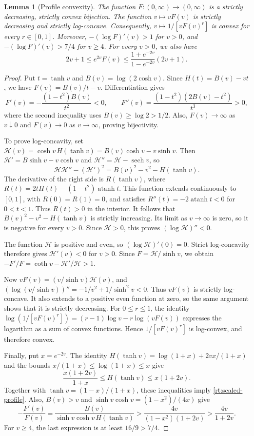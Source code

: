 \documentclass[11pt,letterpaper]{amsart}
\newcommand{\1}{\mathbf 1}
\DeclareMathOperator{\atanh}{atanh}
\newtheorem{lemma}[theorem]{Lemma}
\numberwithin{equation}{section}
\begin{document}
\begin{lemma}[Profile convexity]\label{as:profile-convex}
The function $F:(0,\infty)\to(0,\infty)$ is a strictly
decreasing, strictly convex bijection.
The function $v\mapsto vF(v)$ is strictly decreasing and
strictly log-concave. Consequently,
$v\mapsto1/[vF(v)^r]$ is convex for every $r\in[0,1]$.
Moreover, $-(\log F)'(v)>1$ for $v>0$, and
$-(\log F)'(v)>7/4$ for $v\ge4$.
For every $v>0$, we also have
\begin{equation}\label{rt:scaled-profile}
 2v+1\le e^{2v}F(v)
 \le\frac{1+e^{-2v}}{1-e^{-2v}}(2v+1).
\end{equation}
\end{lemma}
\begin{proof}
Put $t=\tanh v$ and $B(v)=\log(2\cosh v)$.
Since $H(t)=B(v)-vt$, we have $F(v)=B(v)/t-v$.
Differentiation gives
\[
 F'(v)=-\frac{(1-t^2)B(v)}{t^2}<0,\qquad
 F''(v)=\frac{(1-t^2)(2B(v)-t^2)}{t^3}>0,
\]
where the second inequality uses $B(v)\ge\log2>1/2$.
Also, $F(v)\to\infty$ as $v\downarrow0$ and
$F(v)\to0$ as $v\to\infty$, proving bijectivity.

To prove log-concavity, set
$\mathcal H(v)=\cosh v\,H(\tanh v)
=B(v)\cosh v-v\sinh v$.
Then $\mathcal H'=B\sinh v-v\cosh v$ and
$\mathcal H''=\mathcal H-\operatorname{sech}v$, so
\[
 \mathcal H\mathcal H''-(\mathcal H')^2
 =B(v)^2-v^2-H(\tanh v).
\]
The derivative of the right side is $R(\tanh v)$, where
$R(t)=2tH(t)-(1-t^2)\atanh t$.
This function extends continuously to $[0,1]$, with
$R(0)=R(1)=0$, and satisfies
$R''(t)=-2\atanh t<0$ for $0<t<1$.
Thus $R(t)>0$ in the interior.
It follows that $B(v)^2-v^2-H(\tanh v)$ is strictly
increasing. Its limit as $v\to\infty$ is zero, so it is
negative for every $v>0$.
Since $\mathcal H>0$, this proves
$(\log\mathcal H)''<0$.

The function $\mathcal H$ is positive and even, so
$(\log\mathcal H)'(0)=0$.
Strict log-concavity therefore gives $\mathcal H'(v)<0$
for $v>0$. Since $F=\mathcal H/\sinh v$, we obtain
$-F'/F=\coth v-\mathcal H'/\mathcal H>1$.

Now $vF(v)=(v/\sinh v)\mathcal H(v)$, and
$(\log(v/\sinh v))''=-1/v^2+1/\sinh^2v<0$.
Thus $vF(v)$ is strictly log-concave.
It also extends to a positive even function at zero,
so the same argument shows that it is strictly decreasing.
For $0\le r\le1$, the identity
$\log(1/[vF(v)^r])=(r-1)\log v-r\log(vF(v))$
expresses the logarithm as a sum of convex functions.
Hence $1/[vF(v)^r]$ is log-convex, and therefore convex.

Finally, put $x=e^{-2v}$.
The identity
$H(\tanh v)=\log(1+x)+2vx/(1+x)$
and the bounds $x/(1+x)\le\log(1+x)\le x$ give
\[
 \frac{x(1+2v)}{1+x}
 \le H(\tanh v)\le x(1+2v).
\]
Together with $\tanh v=(1-x)/(1+x)$, these inequalities
imply \eqref{rt:scaled-profile}.
Also, $B(v)>v$ and
$\sinh v\cosh v=(1-x^2)/(4x)$ give
\[
 -\frac{F'(v)}{F(v)}
 =\frac{B(v)}{\sinh v\cosh v\,H(\tanh v)}
 >\frac{4v}{(1-x^2)(1+2v)}
 >\frac{4v}{1+2v}.
\]
For $v\ge4$, the last expression is at least $16/9>7/4$.
\end{proof}
\end{document}
